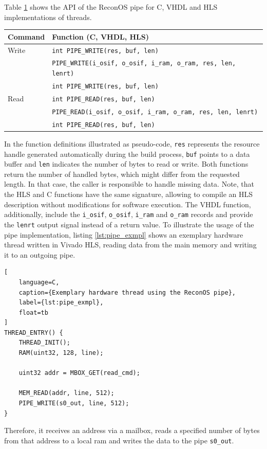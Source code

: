 Table \ref{tab:pipe_api} shows the \ac{API} of the ReconOS pipe for C,
\ac{VHDL} and \ac{HLS} implementations of threads.
\begin{table}
	\scriptsize
	\centering
	\label{tab:pipe_api}
	\begin{tabular}{ll}
	\hline
	\textbf{Command} & \textbf{Function (C, \acs{VHDL}, \acs{HLS})}\\
	\hline
	Write & \lstinline$int PIPE_WRITE(res, buf, len)$\\
	& \lstinline$PIPE_WRITE(i_osif, o_osif, i_ram, o_ram, res, len, lenrt)$\\
	& \lstinline$int PIPE_WRITE(res, buf, len)$\\
	\hline
	Read & \lstinline$int PIPE_READ(res, buf, len)$\\
	& \lstinline$PIPE_READ(i_osif, o_osif, i_ram, o_ram, res, len, lenrt)$\\
	& \lstinline$int PIPE_READ(res, buf, len)$\\
	\hline
	\end{tabular}
\end{table}
In the function definitions illustrated as pseudo-code, \lstinline{res}
represents the resource handle generated automatically during the build
process, \lstinline{buf} points to a data buffer and \lstinline{len} indicates
the number of bytes to read or write. Both functions return the number of
handled bytes, which might differ from the requested length. In that case, the
caller is responsible to handle missing data. Note, that the \ac{HLS} and C
functions have the same signature, allowing to compile an \ac{HLS} description
without modifications for software execution. The \ac{VHDL} function,
additionally, include the \lstinline{i_osif}, \lstinline{o_osif},
\lstinline{i_ram} and \lstinline{o_ram} records and provide the
\lstinline{lenrt} output signal instead of a return value. To illustrate the
usage of the pipe implementation, listing \ref{lst:pipe_exmpl} shows an
exemplary hardware thread written in Vivado HLS, reading data from the main
memory and writing it to an outgoing pipe.
\begin{lstlisting}[
	language=C,
	caption={Exemplary hardware thread using the ReconOS pipe},
	label={lst:pipe_exmpl},
	float=tb
]
THREAD_ENTRY() {
	THREAD_INIT();
	RAM(uint32, 128, line);

	uint32 addr = MBOX_GET(read_cmd);

	MEM_READ(addr, line, 512);
	PIPE_WRITE(s0_out, line, 512);
}
\end{lstlisting}
Therefore, it receives an address via a mailbox, reads a specified number of
bytes from that address to a local ram and writes the data to the pipe
\lstinline{s0_out}.

